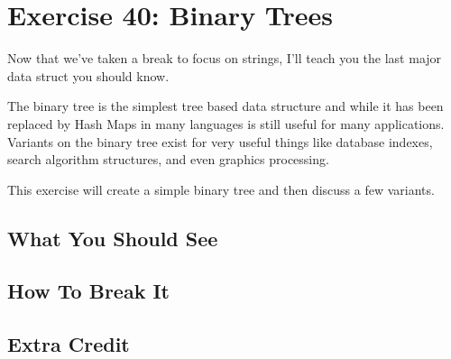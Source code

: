 \chapter{Exercise 40: Binary Trees}

Now that we've taken a break to focus on strings, I'll teach you the last
major data struct you should know.

The binary tree is the simplest tree based data structure and while it has been replaced
by Hash Maps in many languages is still useful for many applications.  Variants on the
binary tree exist for very useful things like database indexes, search algorithm structures,
and even graphics processing.

This exercise will create a simple binary tree and then discuss a few variants.


\section{What You Should See}


\section{How To Break It}


\section{Extra Credit}



